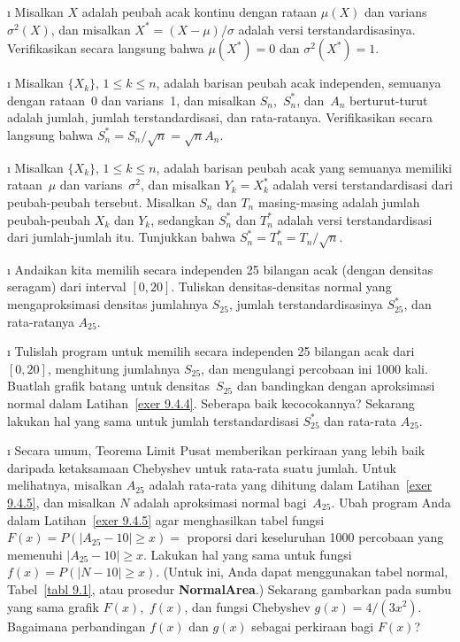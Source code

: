\begin{LJSItem}

\i\label{exer 9.4.1}  Misalkan $X$ adalah peubah acak kontinu dengan rataan $\mu(X)$ dan varians
$\sigma^2(X)$, dan misalkan $X^* = (X - \mu)/\sigma$ adalah versi terstandardisasinya.
Verifikasikan secara langsung bahwa $\mu(X^*) = 0$ dan $\sigma^2(X^*) = 1$.

\i\label{exer 9.4.2}  Misalkan $\{X_k\}$, $1 \leq k \leq n$, adalah barisan peubah acak
independen, semuanya dengan rataan~0 dan varians~1, dan misalkan $S_n$,~$S_n^*$, dan~$A_n$
berturut-turut adalah jumlah, jumlah terstandardisasi, dan rata-ratanya.  Verifikasikan secara
langsung bahwa
$S_n^* = S_n/\sqrt{n} = \sqrt{n} A_n$.

\i\label{exer 9.4.3}  Misalkan $\{X_k\}$, $1 \leq k \leq n$, adalah barisan peubah acak yang
semuanya memiliki rataan~$\mu$ dan varians~$\sigma^2$, dan misalkan $Y_k = X_k^*$ adalah versi
terstandardisasi dari peubah-peubah tersebut.  Misalkan $S_n$ dan $T_n$ masing-masing adalah jumlah
peubah-peubah $X_k$ dan $Y_k$, sedangkan $S_n^*$ dan $T_n^*$ adalah versi terstandardisasi dari
jumlah-jumlah itu.  Tunjukkan bahwa $S_n^* = T_n^* =
T_n/\sqrt{n}$.

\i\label{exer 9.4.4} Andaikan kita memilih secara independen 25 bilangan acak
(dengan densitas seragam) dari interval $[0,20]$.  Tuliskan densitas-densitas normal yang
mengaproksimasi densitas jumlahnya $S_{25}$, jumlah terstandardisasinya
$S_{25}^*$, dan rata-ratanya $A_{25}$.

\i\label{exer 9.4.5} Tulislah program untuk memilih secara independen 25 bilangan acak dari
$[0,20]$, menghitung jumlahnya $S_{25}$, dan mengulangi percobaan ini 1000 kali.  Buatlah grafik
batang untuk densitas~$S_{25}$ dan bandingkan dengan aproksimasi normal dalam
Latihan~\ref{exer 9.4.4}.  Seberapa baik kecocokannya?  Sekarang lakukan hal yang sama untuk jumlah
terstandardisasi $S_{25}^*$ dan rata-rata $A_{25}$.

\i\label{exer 9.4.6}  Secara umum, Teorema Limit Pusat memberikan perkiraan yang lebih baik daripada
ketaksamaan Chebyshev untuk rata-rata suatu jumlah.  Untuk melihatnya, misalkan $A_{25}$ adalah
rata-rata yang dihitung dalam Latihan~\ref{exer 9.4.5}, dan misalkan $N$ adalah aproksimasi normal
bagi~$A_{25}$.  Ubah program Anda dalam Latihan~\ref{exer 9.4.5} agar menghasilkan tabel fungsi
$F(x) = P(|A_{25} - 10| \geq x) = {}$ proporsi dari keseluruhan 1000 percobaan yang memenuhi
$|A_{25} - 10| \geq x$.  Lakukan hal yang sama untuk fungsi $f(x) = P(|N - 10| \geq x)$.
(Untuk ini, Anda dapat menggunakan tabel normal, Tabel~\ref{tabl 9.1}, atau prosedur
{\bf NormalArea}.)  Sekarang gambarkan pada sumbu yang sama grafik $F(x)$,~$f(x)$, dan fungsi
Chebyshev $g(x) = 4/(3x^2)$.  Bagaimana perbandingan $f(x)$ dan $g(x)$ sebagai perkiraan bagi
$F(x)$?


\end{LJSItem}
